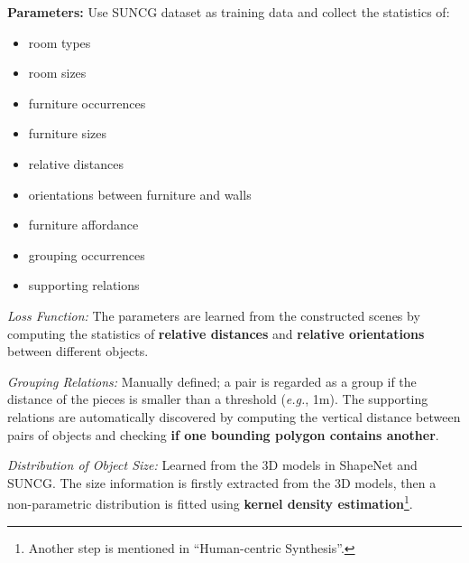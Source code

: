 \documentclass[10pt]{article}
\newcommand{\Eg}{\textit{e.g.}}
\begin{document}
\textbf{Parameters:} Use SUNCG dataset as training data and collect the
statistics of:
%
\begin{itemize}
  \item room types
  \item room sizes
  \item furniture occurrences
  \item furniture sizes
  \item relative distances
  \item orientations between furniture and walls
  \item furniture affordance
  \item grouping occurrences
  \item supporting relations
\end{itemize}

\textit{Loss Function:} The parameters are learned from the constructed scenes
by computing the statistics of \textbf{relative distances} and \textbf{relative
orientations} between different objects.

\textit{Grouping Relations:} Manually defined; a pair is regarded as a group if
the distance of the pieces is smaller than a threshold (\Eg, 1m). The
supporting relations are automatically discovered by computing the vertical
distance between pairs of objects and checking \textbf{if one bounding polygon
contains another}.

\textit{Distribution of Object Size:} Learned from the 3D models in ShapeNet
and SUNCG\@. The size information is firstly extracted from the 3D models, then
a non-parametric distribution is fitted using \textbf{kernel density
estimation}\footnote{Another step is mentioned in ``Human-centric Synthesis''.}.

\end{document}
